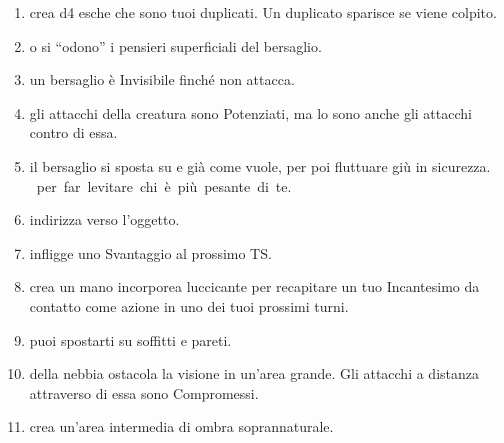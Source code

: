 \documentclass[itdr]{subfiles}
\begin{document}
\begin{enumerate}
	\item {} crea d4 esche che sono tuoi duplicati. Un duplicato sparisce se viene colpito.
	\item {}  o si \mbox{``odono''} i pensieri superficiali del bersaglio.
	\item {} un bersaglio è Invisibile finché non attacca.
	\item {} gli attacchi della creatura sono Potenziati, ma lo sono anche gli attacchi contro di essa.
	\item {} il bersaglio si sposta su e già come vuole, per poi fluttuare giù in sicurezza. \mbox{ per far levitare chi è più pesante di te}.
	\item {} indirizza verso l'oggetto.
	\item {} infligge uno Svantaggio al prossimo TS.
	\item {} crea un mano incorporea luccicante per recapitare un tuo Incantesimo da contatto come azione in uno dei tuoi prossimi turni.
	\item {} puoi spostarti su soffitti e pareti.
	\item {} della nebbia ostacola la visione in un'area grande. Gli attacchi a distanza attraverso di essa sono Compromessi.
	\item {} crea un'area intermedia di ombra soprannaturale.

\vfill
\break


\end{enumerate}
\end{document}
